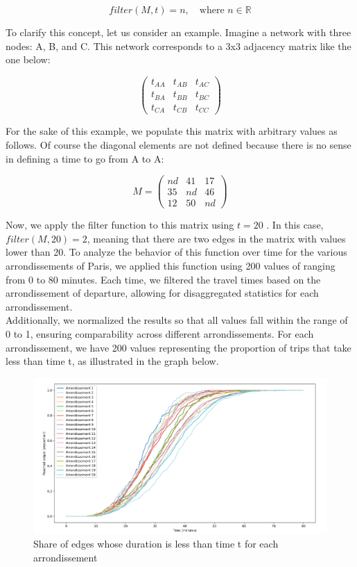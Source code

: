 \documentclass[a4paper,12pt]{article}
\begin{document}
\[
filter(M, t) = n, \quad \text{where } n \in \mathbb{R}
\]

To clarify this concept, let us consider an example. Imagine a network with three nodes: A, B, and C. This network corresponds to a 3x3 adjacency matrix like the one below:

\[
\begin{pmatrix}
	t_{AA} & t_{AB} & t_{AC} \\
	t_{BA} & t_{BB} & t_{BC} \\
	t_{CA} & t_{CB} & t_{CC}
\end{pmatrix}
\]

For the sake of this example, we populate this matrix with arbitrary values as follows. Of course the diagonal elements are not defined because there is no sense in defining a time to go from A to A:

\[
M =
\begin{pmatrix}
	nd & 41 & 17 \\
	35 & nd & 46 \\
	12 & 50 & nd
\end{pmatrix}
\]

Now, we apply the filter function to this matrix using $t=20$ . In this case, $filter(M,20)=2$, meaning that there are two edges in the matrix with values lower than 20. To analyze the behavior of this function over time for the various arrondissements of Paris, we applied this function using 200 values of  ranging from 0 to 80 minutes. Each time, we filtered the travel times based on the arrondissement of departure, allowing for disaggregated statistics for each arrondissement.\\

Additionally, we normalized the results so that all values fall within the range of 0 to 1, ensuring comparability across different arrondissements. For each arrondissement, we have 200 values representing the proportion of trips that take less than time t, as illustrated in the graph below. 

\begin{figure}[h!]
	\centering
	\includegraphics[width=1\textwidth]{images/reached_nodes.png}
	\caption{Share of edges whose duration is less than time t for each arrondissement}
	\label{fig:arr_areas}
\end{figure}
\end{document}
